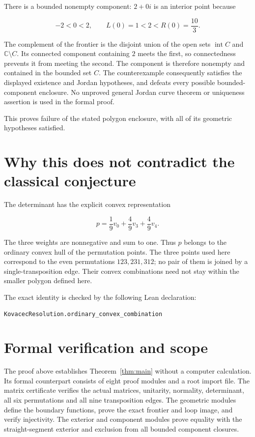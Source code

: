 \documentclass[11pt]{article}
\begin{document}
There is a bounded nonempty component: \(2+0i\) is an interior point
because

\[
-2<0<2,\qquad L(0)=1<2<R(0)=\frac{10}{3}.
\]

The complement of the frontier is the disjoint union of the open sets $\operatorname{int}C$ and $\mathbb C\setminus C$. Its connected component containing $2$ meets the first, so connectedness prevents it from meeting the second. The component is therefore nonempty and contained in the bounded set $C$. The counterexample consequently satisfies the displayed
existence and Jordan hypotheses, and defeats every possible
bounded-component enclosure. No unproved general Jordan curve theorem or
uniqueness assertion is used in the formal proof.

This proves failure of the stated polygon enclosure, with all of its geometric hypotheses satisfied.

\section{Why this does not contradict the classical conjecture}\label{why-this-does-not-contradict-the-classical-conjecture}

The determinant has the explicit convex representation

\[
p=\frac19v_0+\frac49v_3+\frac49v_4.
\]

The three weights are nonnegative and sum to one. Thus \(p\) belongs to
the ordinary convex hull of the permutation points. The three points
used here correspond to the even permutations \(123,231,312\); no pair
of them is joined by a single-transposition edge. Their convex
combinations need not stay within the smaller polygon defined here.

The exact identity is checked by the following Lean declaration:

\begin{verbatim}
KovacecResolution.ordinary_convex_combination
\end{verbatim}


\section{Formal verification and scope}\label{sec:formal}
The proof above establishes Theorem~\ref{thm:main} without a computer calculation. Its formal counterpart consists of eight proof modules and a root import file. The matrix certificate verifies the actual matrices, unitarity, normality, determinant, all six permutations and all nine transposition edges. The geometric modules define the boundary functions, prove the exact frontier and loop image, and verify injectivity. The exterior and component modules prove equality with the straight-segment exterior and exclusion from all bounded component closures.
\end{document}
